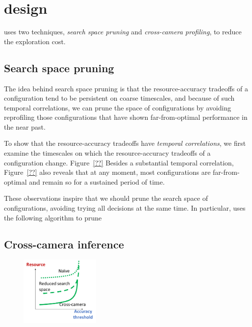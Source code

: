 \section{\name design}

\name uses two techniques, {\em search space pruning} and 
{\em cross-camera profiling}, to reduce the exploration cost.

\subsection{Search space pruning}
The idea behind search space pruning is that the resource-accuracy 
tradeoffs of a configuration tend to be persistent on coarse
timescales, and because of such temporal correlations, we can prune
the space of configurations by avoiding reprofiling those 
configurations that have shown far-from-optimal performance in the 
near past.

To show that the resource-accuracy tradeoffs have {\em temporal 
correlations}, we first examine the timescales on which the 
resource-accuracy tradeoffs of a configuration change. 
Figure~\ref{??} 
Besides a substantial temporal correlation, Figure~\ref{??} also
reveals that at any moment, most configurations are far-from-optimal
and remain so for a sustained period of time.

These observations inspire that we should prune the search space of 
configurations, avoiding trying all decisions at the same time.
In particular, \name uses the following algorithm to prune


\subsection{Cross-camera inference}

\begin{figure}[h!]
\centering
\includegraphics[width=0.35\textwidth]{figures/ReducingCost.pdf}
\vspace{-0.2cm}
\label{fig:}
\end{figure}
